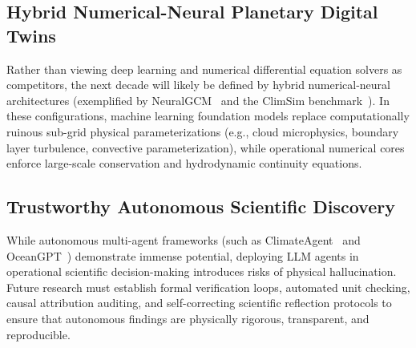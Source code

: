 \subsection{Hybrid Numerical-Neural Planetary Digital Twins}
Rather than viewing deep learning and numerical differential equation solvers as competitors, the next decade will likely be defined by hybrid numerical-neural architectures (exemplified by NeuralGCM~\cite{kochkov2024neuralgcm} and the ClimSim benchmark~\cite{yu2023climsim}). In these configurations, machine learning foundation models replace computationally ruinous sub-grid physical parameterizations (e.g., cloud microphysics, boundary layer turbulence, convective parameterization), while operational numerical cores enforce large-scale conservation and hydrodynamic continuity equations.

\subsection{Trustworthy Autonomous Scientific Discovery}
While autonomous multi-agent frameworks (such as ClimateAgent~\cite{li2025climateagent} and OceanGPT~\cite{bi2024oceangpt}) demonstrate immense potential, deploying LLM agents in operational scientific decision-making introduces risks of physical hallucination. Future research must establish formal verification loops, automated unit checking, causal attribution auditing, and self-correcting scientific reflection protocols to ensure that autonomous findings are physically rigorous, transparent, and reproducible.
